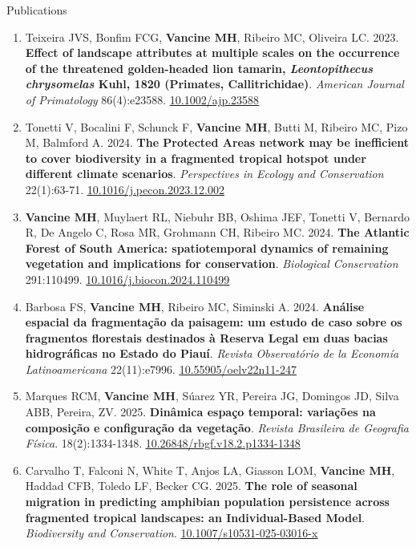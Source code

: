 \documentclass{resume}
\begin{document}
\begin{rSection}{Publications}
\begin{enumerate}
\item Teixeira JVS, Bonfim FCG, {\bf Vancine MH}, Ribeiro MC, Oliveira LC. 2023. {\bf Effect of landscape attributes at multiple scales on the occurrence of the threatened golden-headed lion tamarin, \textbf{\textit{Leontopithecus chrysomelas}} Kuhl, 1820 (Primates, Callitrichidae)}. {\it American Journal of Primatology} 86(4):e23588. \href{https://doi.org/10.1002/ajp.23588}{\underline{10.1002/ajp.23588}}

\item Tonetti V, Bocalini F, Schunck F, {\bf Vancine MH}, Butti M, Ribeiro MC, Pizo M, Balmford A. 2024. {\bf The Protected Areas network may be inefficient to cover biodiversity in a fragmented tropical hotspot under different climate scenarios}. {\it Perspectives in Ecology and Conservation} 22(1):63-71. \href{https://doi.org/10.1016/j.pecon.2023.12.002}{\underline{10.1016/j.pecon.2023.12.002}}

\item {\bf Vancine MH}, Muylaert RL, Niebuhr BB, Oshima JEF, Tonetti V, Bernardo R, De Angelo C, Rosa MR, Grohmann CH, Ribeiro MC. 2024. {\bf The Atlantic Forest of South America: spatiotemporal dynamics of remaining vegetation and implications for conservation}. {\it Biological Conservation} 291:110499. \href{https://doi.org/10.1016/j.biocon.2024.110499}{\underline{10.1016/j.biocon.2024.110499}}

\item Barbosa FS, {\bf Vancine MH}, Ribeiro MC, Siminski A. 2024. {\bf Análise espacial da fragmentação da paisagem: um estudo de caso sobre os fragmentos florestais destinados à Reserva Legal em duas bacias hidrográficas no Estado do Piauí}. {\it Revista Observatório de la Economía Latinoamericana} 22(11):e7996. \href{https://doi.org/10.55905/oelv22n11-247}{\underline{10.55905/oelv22n11-247}}

\item Marques RCM, {\bf Vancine MH}, Súarez YR, Pereira JG, Domingos JD, Silva ABB, Pereira, ZV. 2025. {\bf Dinâmica espaço temporal: variações na composição e configuração da vegetação}. {\it Revista Brasileira de Geografia Física}. 18(2):1334-1348. \href{https://doi.org/10.26848/rbgf.v18.2.p1334-1348}{\underline{10.26848/rbgf.v18.2.p1334-1348}}

\item Carvalho T, Falconi N, White T, Anjos LA, Giasson LOM, {\bf Vancine MH}, Haddad CFB, Toledo LF, Becker CG. 2025. {\bf The role of seasonal migration in predicting amphibian population persistence across fragmented tropical landscapes: an Individual-Based Model}. {\it Biodiversity and Conservation}. \href{https://doi.org/10.1007/s10531-025-03016-x}{\underline{10.1007/s10531-025-03016-x}}


\end{enumerate}
\end{rSection}
\end{document}
